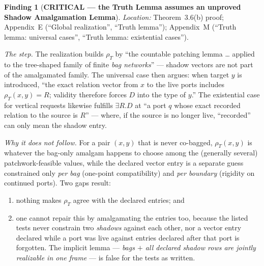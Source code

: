 \documentclass[11pt]{article}
\theoremstyle{definition}
\newtheorem{finding}{Finding}
\begin{document}
\begin{finding}[\textbf{CRITICAL --- the Truth Lemma assumes an unproved
Shadow Amalgamation Lemma}]\label{f:shadow}
\emph{Location:} Theorem~3.6(b) proof; Appendix~E (``Global realization'',
``Truth lemma''); Appendix~M (``Truth lemma: universal cases'',
``Truth lemma: existential cases'').

\emph{The step.}  The realization builds $\rho_T$ by ``the countable
patching lemma \ldots{} applied to the tree-shaped family of finite
\emph{bag networks}'' --- shadow vectors are not part of the amalgamated
family.  The universal case then argues: when target $y$ is introduced,
``the exact relation vector from $x$ to the live ports includes
$\rho_T(x,y)=R$; validity therefore forces $D$ into the type of $y$.''
The existential case for vertical requests likewise fulfills
$\exists R.D$ at ``a port $q$ whose exact recorded relation to the source
is $R$'' --- where, if the source is no longer live, ``recorded'' can only
mean the shadow entry.

\emph{Why it does not follow.}  For a pair $(x,y)$ that is never co-bagged,
$\rho_T(x,y)$ is whatever the bag-only amalgam happens to choose among the
(generally several) patchwork-feasible values, while the declared vector
entry is a separate guess constrained only \emph{per bag} (one-point
compatibility) and \emph{per boundary} (rigidity on continued ports).
Two gaps result:
\begin{enumerate}[label=(\alph*),leftmargin=2em]
\item nothing makes $\rho_T$ agree with the declared entries; and
\item one cannot repair this by amalgamating the entries too, because the
listed tests never constrain two \emph{shadows} against each other, nor a
vector entry declared while a port was live against entries declared after
that port is forgotten.  The implicit lemma ---
\emph{bags $+$ all declared shadow rows are jointly realizable in one
frame} --- is false for the tests as written.
\end{enumerate}


\end{finding}
\end{document}
